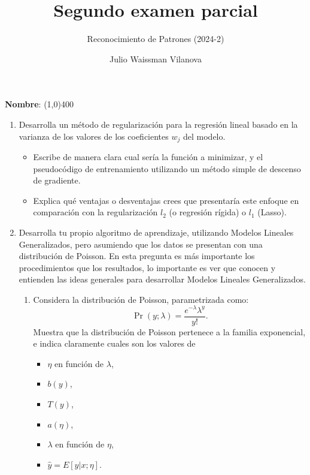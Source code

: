 \documentclass[11pt]{article}
\title{Segundo examen parcial}
\author{Reconocimiento de Patrones (2024-2)}
\date{Julio Waissman Vilanova}
\begin{document}
\maketitle

\vspace{5mm}

\textbf{Nombre}: \line(1,0){400}

\vspace{9mm}


\begin{enumerate}

\item Desarrolla un método de regularización para la regresión lineal 
basado en la varianza de los valores de los coeficientes $w_j$ del modelo. 

\begin{itemize}
    \item Escribe de manera clara cual sería la función a minimizar, y el pseudocódigo de entrenamiento 
    utilizando un método simple de descenso de gradiente.
    \item Explica qué ventajas o desventajas crees que presentaría este enfoque 
    en comparación con la regularización $l_2$ (o regresión rígida) o $l_1$ (Lasso).
\end{itemize}


\item Desarrolla tu propio algoritmo de aprendizaje, utilizando
Modelos Lineales Generalizados, pero asumiendo que los datos se presentan con una
distribución de Poisson. En esta pregunta es más importante los procedimientos que los
resultados, lo importante es ver que conocen y entienden las ideas generales para
desarrollar Modelos Lineales Generalizados.

\begin{enumerate}
\item Considera la distribución de Poisson, parametrizada como:
$$
\Pr(y; \lambda) = \frac{e^{-\lambda} \lambda^y}{y!}.
$$
Muestra que la distribución de Poisson pertenece a la familia exponencial, e indica
claramente cuales son los valores de 
\begin{itemize}
\item $\eta$ en función de $\lambda$,
\item $b(y)$,
\item $T(y)$,
\item $a(\eta)$,
\item $\lambda$ en función de $\eta$,
\item $\hat{y} = E[y|x; \eta]$.
\end{itemize}


\end{enumerate}
\end{enumerate}
\end{document}
